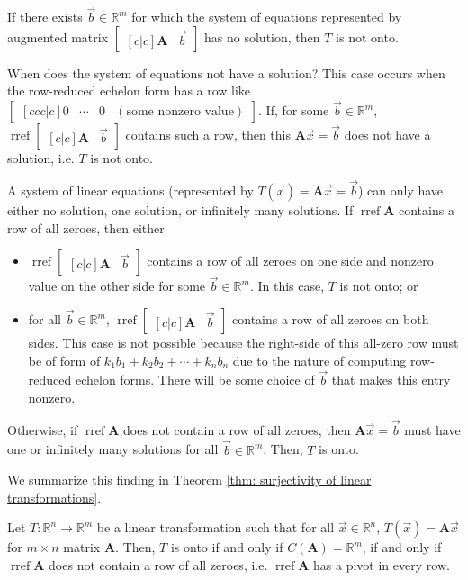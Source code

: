 \documentclass[]{book}
\DeclareMathOperator{\rref}{rref}
\newcommand{\mat}[1]{\ensuremath{\mathbf{#1}}}
\newcommand{\R}{\ensuremath{\mathbb{R}}}
\begin{document}
If there exists $\vec{b} \in \R^m$ for which the system of equations represented by augmented matrix $\begin{bmatrix}[c|c]\mat{A} & \vec{b}\end{bmatrix}$ has no solution, then $T$ is not onto. 

When does the system of equations not have a solution? This case occurs when the row-reduced echelon form has a row like $\begin{bmatrix}[ccc|c]0 & \cdots & 0 & (\text{some nonzero value})\end{bmatrix}$. If, for some $\vec{b} \in \R^m$, $\rref\begin{bmatrix}[c|c]\mat{A} & \vec{b}\end{bmatrix}$ contains such a row, then this $\mat{A}\vec{x} = \vec{b}$ does not have a solution, i.e. $T$ is not onto.

A system of linear equations (represented by $T(\vec{x}) = \mat{A}\vec{x} = \vec{b}$) can only have either no solution, one solution, or infinitely many solutions. If $\rref\mat{A}$ contains a row of all zeroes, then either
\begin{itemize}
    \item $\rref\begin{bmatrix}[c|c]\mat{A} &\vec{b}\end{bmatrix}$ contains a row of all zeroes on one side and nonzero value on the other side for some $\vec{b} \in \R^m$. In this case, $T$ is not onto; or
    \item for all $\vec{b} \in \R^m$, $\rref\begin{bmatrix}[c|c]\mat{A} &\vec{b}\end{bmatrix}$ contains a row of all zeroes on both sides. This case is not possible because the right-side of this all-zero row must be of form of $k_1b_1 + k_2b_2 + \cdots + k_nb_n$ due to the nature of computing row-reduced echelon forms. There will be some choice of $\vec{b}$ that makes this entry nonzero.
\end{itemize}
Otherwise, if $\rref\mat{A}$ does not contain a row of all zeroes, then $\mat{A} \vec{x} = \vec{b}$ must have one or infinitely many solutions for all $\vec{b} \in \R^m$. Then, $T$ is onto.

We summarize this finding in Theorem \ref{thm: surjectivity of linear transformations}.
\begin{theorem}
    \label{thm: surjectivity of linear transformations}
    Let $T:\R^n \to \R^m$ be a linear transformation such that for all $\vec{x} \in \R^n$, $T(\vec{x}) = \mat{A}\vec{x}$ for $m \times n$ matrix $\mat{A}$. Then, $T$ is onto if and only if $C(\mat{A}) = \R^m$, if and only if $\rref{\mat{A}}$ does not contain a row of all zeroes, i.e. $\rref\mat{A}$ has a pivot in every row.
\end{theorem}
\end{document}
